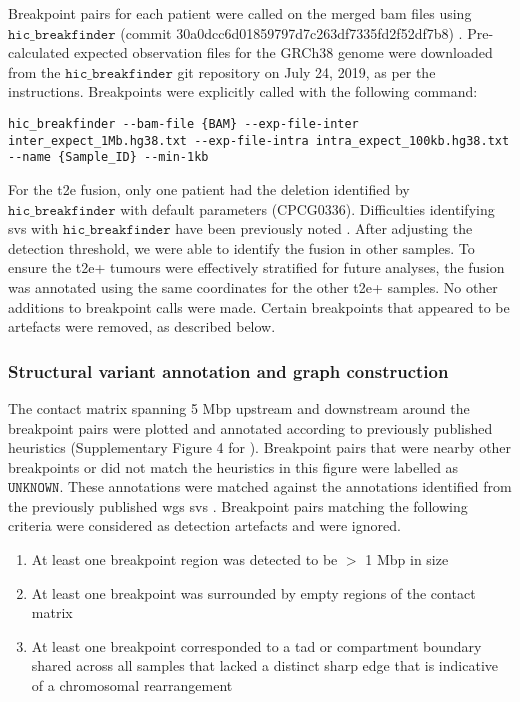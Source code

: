 Breakpoint pairs for each patient were called on the merged \gls{bam} files \cite{liSequenceAlignmentMap2009} using $\texttt{hic\_breakfinder}$ (commit 30a0dcc6d01859797d7c263df7335fd2f52df7b8) \cite{dixonIntegrativeDetectionAnalysis2018}.
Pre-calculated expected observation files for the GRCh38 genome were downloaded from the $\texttt{hic\_breakfinder}$ git repository on July 24, 2019, as per the instructions.
Breakpoints were explicitly called with the following command:

\begin{lstlisting}[basicstyle=\ttfamily]
hic_breakfinder --bam-file {BAM} --exp-file-inter inter_expect_1Mb.hg38.txt --exp-file-intra intra_expect_100kb.hg38.txt --name {Sample_ID} --min-1kb
\end{lstlisting}

For the \gls{t2e} fusion, only one patient had the deletion identified by $\texttt{hic\_breakfinder}$ with default parameters (CPCG0336).
Difficulties identifying \glspl{sv} with $\texttt{hic\_breakfinder}$ have been previously noted \cite{hoStructuralVariationSequencing2020}.
After adjusting the detection threshold, we were able to identify the fusion in other samples.
To ensure the \gls{t2e}+ tumours were effectively stratified for future analyses, the fusion was annotated using the same coordinates for the other \gls{t2e}+ samples.
No other additions to breakpoint calls were made.
Certain breakpoints that appeared to be artefacts were removed, as described below.

\subsubsection{Structural variant annotation and graph construction}

The contact matrix spanning 5 Mbp upstream and downstream around the breakpoint pairs were plotted and annotated according to previously published heuristics (Supplementary Figure 4 for \cite{dixonIntegrativeDetectionAnalysis2018}).
Breakpoint pairs that were nearby other breakpoints or did not match the heuristics in this figure were labelled as $\texttt{UNKNOWN}$.
These annotations were matched against the annotations identified from the previously published \gls{wgs} \glspl{sv} \cite{fraserGenomicHallmarksLocalized2017}.
Breakpoint pairs matching the following criteria were considered as detection artefacts and were ignored.

\begin{enumerate}
  \item At least one breakpoint region was detected to be $>$ 1 Mbp in size
  \item At least one breakpoint was surrounded by empty regions of the contact matrix
  \item At least one breakpoint corresponded to a \gls{tad} or compartment boundary shared across all samples that lacked a distinct sharp edge that is indicative of a chromosomal rearrangement
\end{enumerate}

